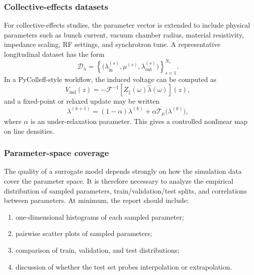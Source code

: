 \documentclass[11pt,a4paper]{article}
\begin{document}
\begin{sloppypar}
\subsubsection{Collective-effects datasets}
For collective-effects studies, the parameter vector is extended to include physical parameters such as bunch current, vacuum chamber radius, material resistivity, impedance scaling, RF settings, and synchrotron tune. A representative longitudinal dataset has the form
\begin{equation}
    \mathcal{D}_{\lambda}
    =
    \left\{
    \big(\lambda_{\mathrm{in}}^{(s)},\mu^{(s)},\lambda_{\mathrm{out}}^{(s)}\big)
    \right\}_{s=1}^{N_s}.
    \label{eq:longitudinal_dataset}
\end{equation}
In a PyColleff-style workflow, the induced voltage can be computed as
\begin{equation}
    V_{\mathrm{ind}}(z)
    =
    -\mathcal{F}^{-1}\left[
    Z_{\parallel}(\omega)\widehat{\lambda}(\omega)
    \right](z),
    \label{eq:induced_voltage_main}
\end{equation}
and a fixed-point or relaxed update may be written
\begin{equation}
    \lambda^{(k+1)}
    =
    (1-\alpha)\lambda^{(k)}
    +
    \alpha\mathcal{T}_{\mu}\big(\lambda^{(k)}\big),
    \label{eq:relaxed_density_update}
\end{equation}
where $\alpha$ is an under-relaxation parameter. This gives a controlled nonlinear map on line densities.

\subsubsection{Parameter-space coverage}
The quality of a surrogate model depends strongly on how the simulation data cover the parameter space. It is therefore necessary to analyze the empirical distribution of sampled parameters, train/validation/test splits, and correlations between parameters. At minimum, the report should include:
\begin{enumerate}[label=(\roman*)]
    \item one-dimensional histograms of each sampled parameter;
    \item pairwise scatter plots of sampled parameters;
    \item comparison of train, validation, and test distributions;
    \item discussion of whether the test set probes interpolation or extrapolation.
\end{enumerate}


\end{sloppypar}
\end{document}
